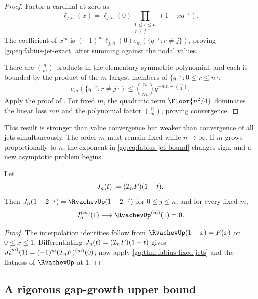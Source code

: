 \begin{proof}
Factor a cardinal at zero as
\[
 \ell_{j,n}(x)=\ell_{j,n}(0)
 \prod_{\substack{0\le r\le n\\r\ne j}}(1-xq^{-r}).
\]
The coefficient of $x^m$ is
$(-1)^m\ell_{j,n}(0)e_m(\{q^{-r}:r\ne j\})$, proving
\eqref{gq:eq:fabius-jet-exact} after summing against the nodal values.

There are $\binom nm$ products in the elementary symmetric polynomial, and
each is bounded by the product of the $m$ largest members of
$\{q^{-r}:0\le r\le n\}$:
\begin{equation}
 e_m(\{q^{-r}:r\ne j\})
 \le\binom nm q^{-mn+\binom m2}.
 \label{gq:eq:elementary-symmetric-jet-bound}
\end{equation}
Apply the proof of .  For fixed $m$, the
quadratic term $\Floor{n^2/4}$ dominates the linear loss $mn$ and the
polynomial factor $\binom nm$, proving convergence.
\end{proof}

This result is stronger than value convergence but weaker than convergence
of all jets simultaneously.  The order $m$ must remain fixed while
$n\to\infty$.  If $m$ grows proportionally to $n$, the exponent in
\eqref{gq:eq:fabius-jet-bound} changes sign, and a new asymptotic problem begins.

\begin{corollary}
\label{gq:cor:up-boundary-jets}
Let
\begin{equation}
 J_n(t):=(\mathcal I_nF)(1-t).
 \label{gq:eq:up-reflected-interpolant}
\end{equation}
Then $J_n(1-2^{-j})=\RvachevUp(1-2^{-j})$ for $0\le j\le n$, and for every fixed
$m$,
\begin{equation}
 J_n^{(m)}(1)\longrightarrow\RvachevUp^{(m)}(1)=0.
 \label{gq:eq:up-fixed-boundary-jet}
\end{equation}
\end{corollary}

\begin{proof}
The interpolation identities follow from
$\RvachevUp(1-x)=F(x)$ on $0\le x\le1$.  Differentiating
$J_n(t)=(\mathcal I_nF)(1-t)$ gives
$J_n^{(m)}(1)=(-1)^m(\mathcal I_nF)^{(m)}(0)$; now apply
\cref{gq:thm:fabius-fixed-jets} and the flatness of $\RvachevUp$ at $1$.
\end{proof}

\subsection{A rigorous gap-growth upper bound}
\label{gq:sec:fabius-gap-bound}

